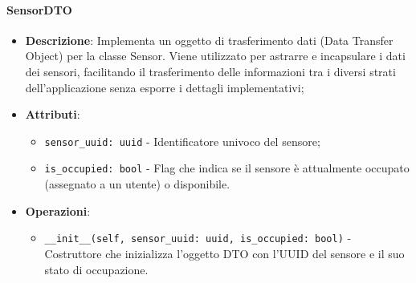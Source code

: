 \documentclass[10pt]{article}
\begin{document}
    \paragraph{SensorDTO}
    \begin{itemize} 
    \item \textbf{Descrizione}: Implementa un oggetto di trasferimento dati (Data Transfer Object) per la classe Sensor. Viene utilizzato per astrarre e incapsulare i dati dei sensori, facilitando il trasferimento delle informazioni tra i diversi strati dell'applicazione senza esporre i dettagli implementativi;
    \item \textbf{Attributi}:
    \begin{itemize}
        \item \texttt{sensor\_uuid: uuid} - Identificatore univoco del sensore;
        \item \texttt{is\_occupied: bool} - Flag che indica se il sensore è attualmente occupato (assegnato a un utente) o disponibile.
    \end{itemize}
    
    \item \textbf{Operazioni}:
    \begin{itemize}
        \item \texttt{\_\_init\_\_(self, sensor\_uuid: uuid, is\_occupied: bool)} - Costruttore che inizializza l'oggetto DTO con l'UUID del sensore e il suo stato di occupazione.
    \end{itemize}
    \end{itemize}
\end{document}
